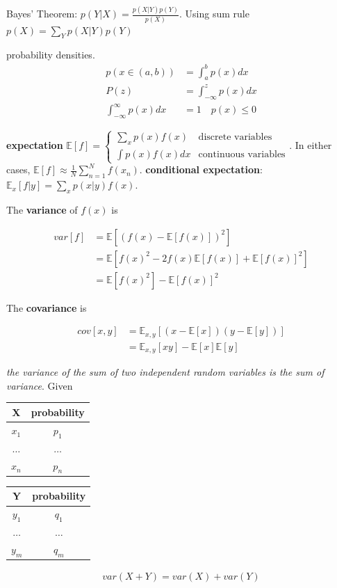 \documentclass[11pt]{article}
\begin{document}
Bayes' Theorem: \(p(Y|X)=\frac{p(X|Y)p(Y)}{p(X)}\). Using sum rule
\(p(X)=\displaystyle\sum_Yp(X|Y)p(Y)\)

probability densities. 
\begin{align*}
p(x\in(a,b))&=\int_a^bp(x)dx\\
P(z)&=\int_{-\infty}^z p(x)dx\\
\int_{-\infty}^\infty p(x)dx&=1\quad p(x)\le0
\end{align*}


\textbf{expectation} \(\mathbb{E}[f]=
   \begin{cases}
   \displaystyle\sum_{x}p(x)f(x) & \text{discrete variables}\\
   \int p(x)f(x)dx & \text{continuous variables}
   \end{cases}\). In either cases,
\(\mathbb{E}[f]\approx\frac{1}{N}\displaystyle\sum_{n=1}^N f(x_n)\).
\textbf{conditional expectation}: \(\mathbb{E}_x[f| y]=\displaystyle\sum_xp(x| y)f(x)\).

The \textbf{variance} of \(f(x)\) is

\begin{align*}
var[f]&=\mathbb{E}[(f(x)-\mathbb{E}[f(x)])^2]\\
&=\mathbb{E}[f(x)^2-2f(x)\mathbb{E}[f(x)]+\mathbb{E}[f(x)]^2]\\
&=\mathbb{E}[f(x)^2]-\mathbb{E}[f(x)]^2
\end{align*}


The \textbf{covariance} is

\begin{align*}
cov[x,y]&=\mathbb{E}_{x,y}[(x-\mathbb{E}[x])(y-\mathbb{E}[y])]\\
&=\mathbb{E}_{x,y}[xy]-\mathbb{E}[x]\mathbb{E}[y]
\end{align*}


\emph{the variance of the sum of two independent random variables is the sum of}
\emph{variance}. Given
\begin{center}
\begin{tabular}{c|c}
X & probability\\
\hline
\(x_1\) & \(p_1\)\\
\(\dots\) & \(\dots\)\\
\(x_n\) & \(p_n\)\\
\end{tabular}
\end{center}

\begin{center}
\begin{tabular}{c|c}
Y & probability\\
\hline
\(y_1\) & \(q_1\)\\
\(\dots\) & \(\dots\)\\
\(y_m\) & \(q_m\)\\
\end{tabular}
\end{center}
\begin{align*}
var(X+Y)=var(X)+var(Y)
\end{align*}
\end{document}
